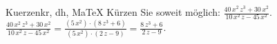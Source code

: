 \begin{MAufgabe}{Kuerzen}{kr, dh, MaTeX}
K\"urzen Sie soweit m\"oglich: $\frac{40\, x^2\, z^3 + 30\, x^2}{10\, x^2\, z - 45\, x^2}$.\\ 
\ifLsg\MLoesung
\quad $\frac{40\, x^2\, z^3 + 30\, x^2}{10\, x^2\, z - 45\, x^2}=\frac{(5\, x^2)\cdot(8\, z^3 + 6)}{(5\, x^2)\cdot(2\, z - 9)}=\frac{8\, z^3 + 6}{2\, z - 9}$.\else\relax\fi
 \end{MAufgabe}